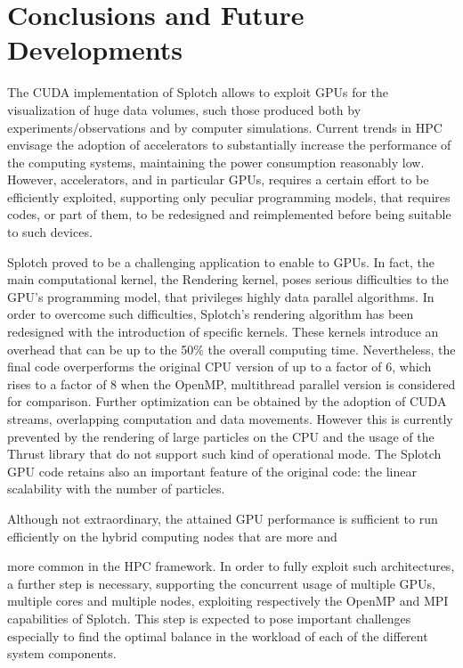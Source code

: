 \documentclass[1p]{elsarticle}
\begin{document}
\section{Conclusions and Future Developments}
\label{sec:conclusions}
The CUDA implementation of Splotch allows to exploit GPUs 
for the visualization of huge data volumes, such those produced both 
by experiments/observations and by computer simulations. Current trends
in HPC envisage the adoption of accelerators to substantially 
increase the performance of the computing systems, maintaining the power
consumption reasonably low. However, accelerators, and in particular 
GPUs, requires a certain effort to be efficiently exploited, 
supporting only peculiar programming models, that requires codes, or part
of them, to be redesigned and reimplemented before being suitable to such devices. 

Splotch proved to be a challenging application to enable to GPUs. 
In fact, the main computational kernel, the Rendering kernel, poses serious difficulties
to the GPU's programming model, that privileges highly data parallel algorithms.
In order to overcome such difficulties, Splotch's rendering algorithm has been
redesigned with the introduction of specific kernels. These kernels 
introduce an overhead that can be up to the 50\% the overall computing
time. Nevertheless, the final code overperforms the original CPU
version of up to a factor of 6, which rises to a factor of 8 when the OpenMP,
multithread parallel version is considered for comparison. Further optimization can
be obtained by the adoption of CUDA streams, overlapping computation 
and data movements. However this is currently prevented by the rendering of large particles on the CPU and the usage of the Thrust library that do not support such kind of operational mode. 
The Splotch GPU code retains also an important feature of the original
code: the linear scalability with the number of particles.

Although not extraordinary, the attained GPU performance is sufficient 
to run efficiently on the hybrid computing nodes that are more and 

more common in the HPC framework. In order to fully exploit such architectures, 
a further step is necessary, supporting the concurrent usage of 
multiple GPUs, multiple cores and multiple nodes, exploiting respectively the OpenMP and
MPI capabilities of Splotch. This step is expected to pose important 
challenges especially to find the optimal balance in the workload of each of the different 
system components.
\end{document}
